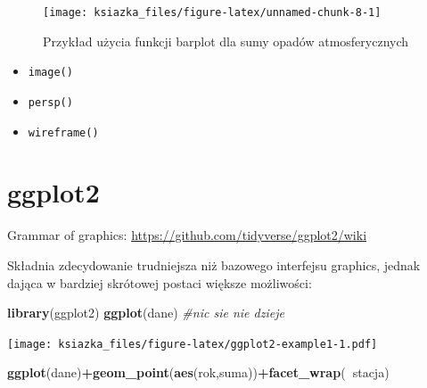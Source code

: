 \documentclass[]{book}
\newenvironment{Shaded}{\begin{snugshade}}{\end{snugshade}}
\newcommand{\KeywordTok}[1]{\textcolor[rgb]{0.13,0.29,0.53}{\textbf{#1}}}
\newcommand{\DataTypeTok}[1]{\textcolor[rgb]{0.13,0.29,0.53}{#1}}
\newcommand{\DecValTok}[1]{\textcolor[rgb]{0.00,0.00,0.81}{#1}}
\newcommand{\StringTok}[1]{\textcolor[rgb]{0.31,0.60,0.02}{#1}}
\newcommand{\CommentTok}[1]{\textcolor[rgb]{0.56,0.35,0.01}{\textit{#1}}}
\newcommand{\OperatorTok}[1]{\textcolor[rgb]{0.81,0.36,0.00}{\textbf{#1}}}
\newcommand{\NormalTok}[1]{#1}
\providecommand{\tightlist}{%
  \setlength{\itemsep}{0pt}\setlength{\parskip}{0pt}}
\theoremstyle{definition}
\theoremstyle{definition}
\theoremstyle{definition}
\theoremstyle{remark}
\begin{document}
\begin{Shaded}
\end{Shaded}

\begin{figure}
\texttt{[image: ksiazka\_files/figure-latex/unnamed-chunk-8-1]} \caption{Przykład użycia funkcji barplot dla sumy opadów atmosferycznych}\label{fig:unnamed-chunk-8}
\end{figure}

\begin{itemize}
\tightlist
\item
  \texttt{image()}
\item
  \texttt{persp()}
\item
  \texttt{wireframe()}
\end{itemize}

\section{ggplot2}\label{ggplot2}

Grammar of graphics: \url{https://github.com/tidyverse/ggplot2/wiki}

Składnia zdecydowanie trudniejsza niż bazowego interfejsu graphics,
jednak dająca w bardziej skrótowej postaci większe możliwości:

\begin{Shaded}
\begin{Highlighting}[]
\KeywordTok{library}\NormalTok{(ggplot2)}
\KeywordTok{ggplot}\NormalTok{(dane) }\CommentTok{#nic sie nie dzieje}
\end{Highlighting}
\end{Shaded}

\texttt{[image: ksiazka\_files/figure-latex/ggplot2-example1-1.pdf]}

\begin{Shaded}
\begin{Highlighting}[]
\KeywordTok{ggplot}\NormalTok{(dane)}\OperatorTok{+}\KeywordTok{geom_point}\NormalTok{(}\KeywordTok{aes}\NormalTok{(rok,suma))}\OperatorTok{+}\KeywordTok{facet_wrap}\NormalTok{(}\OperatorTok{~}\NormalTok{stacja)}
\end{Highlighting}
\end{Shaded}
\end{document}
